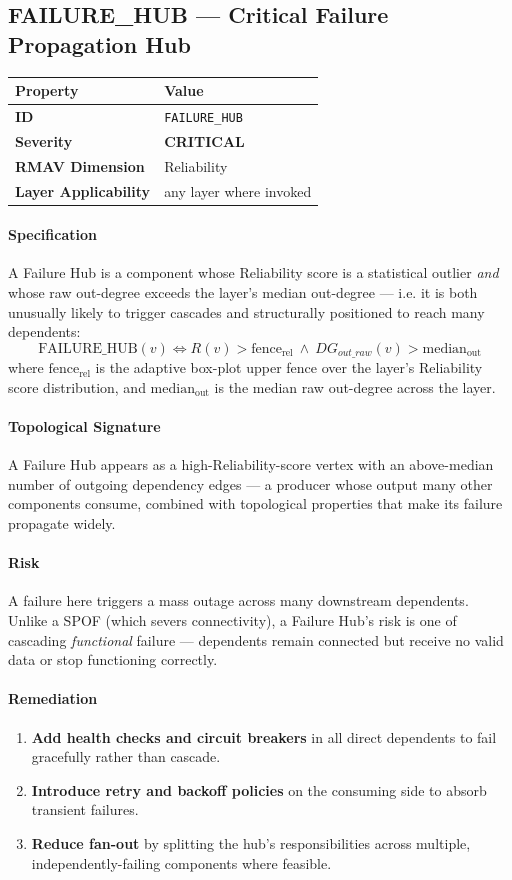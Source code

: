 \documentclass[11pt]{article}
\makeatletter
\newcommand{\CRITICAL}{\textcolor{red!70!black}{\textbf{CRITICAL}}}
\newcommand{\patternprop}[4]{%
  \begin{center}
  \begin{tabular}{@{}ll@{}}
  \toprule
  \textbf{Property} & \textbf{Value} \\
  \midrule
  \textbf{ID} & \texttt{#1} \\
  \textbf{Severity} & #2 \\
  \textbf{RMAV Dimension} & #3 \\
  \textbf{Layer Applicability} & #4 \\
  \bottomrule
  \end{tabular}
  \end{center}
}
\makeatother
\begin{document}
\subsection{FAILURE\_HUB --- Critical Failure Propagation Hub}
\patternprop{FAILURE\_HUB}{\CRITICAL}{Reliability}{any layer where invoked}

\paragraph{Specification}
A Failure Hub is a component whose Reliability score is a statistical outlier \emph{and} whose raw out-degree exceeds the layer's median out-degree --- i.e. it is both unusually likely to trigger cascades and structurally positioned to reach many dependents:
\[
\mathrm{FAILURE\_HUB}(v) \Leftrightarrow R(v) > \mathrm{fence}_{\text{rel}}\ \land\ DG_{out\_raw}(v) > \mathrm{median}_{\text{out}}
\]
where $\mathrm{fence}_{\text{rel}}$ is the adaptive box-plot upper fence over the layer's Reliability score distribution, and $\mathrm{median}_{\text{out}}$ is the median raw out-degree across the layer.

\paragraph{Topological Signature}
A Failure Hub appears as a high-Reliability-score vertex with an above-median number of outgoing dependency edges --- a producer whose output many other components consume, combined with topological properties that make its failure propagate widely.

\paragraph{Risk}
A failure here triggers a mass outage across many downstream dependents. Unlike a SPOF (which severs connectivity), a Failure Hub's risk is one of cascading \emph{functional} failure --- dependents remain connected but receive no valid data or stop functioning correctly.

\paragraph{Remediation}
\begin{enumerate}[leftmargin=*]
\item \textbf{Add health checks and circuit breakers} in all direct dependents to fail gracefully rather than cascade.
\item \textbf{Introduce retry and backoff policies} on the consuming side to absorb transient failures.
\item \textbf{Reduce fan-out} by splitting the hub's responsibilities across multiple, independently-failing components where feasible.
\end{enumerate}
\end{document}

